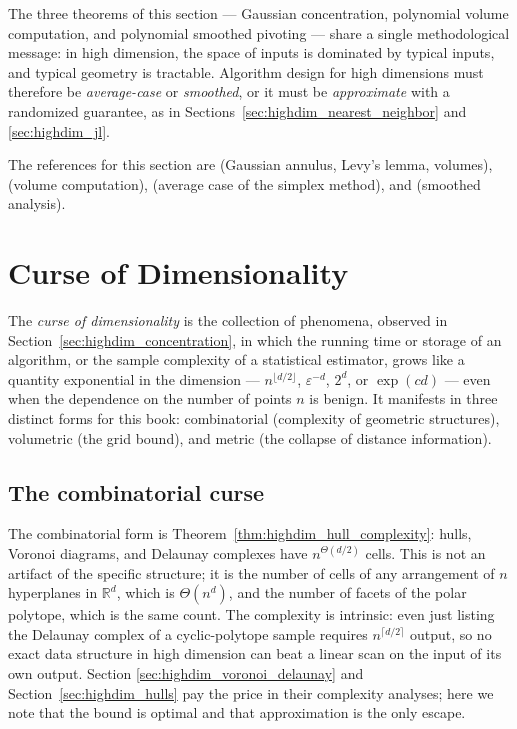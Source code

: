 \begin{remark}
The three theorems of this section --- Gaussian concentration, polynomial
volume computation, and polynomial smoothed pivoting --- share a single
methodological message: in high dimension, the space of inputs is dominated by
typical inputs, and typical geometry is tractable. Algorithm design for high
dimensions must therefore be \emph{average-case} or \emph{smoothed}, or it
must be \emph{approximate} with a randomized guarantee, as in
Sections~\ref{sec:highdim_nearest_neighbor} and \ref{sec:highdim_jl}.
\end{remark}

The references for this section are \cite{matousek2002} (Gaussian annulus,
Levy's lemma, volumes), \cite{dyerfriezekannan1991} (volume computation),
\cite{borgwardt1987} (average case of the simplex method), and
\cite{spielteng2004} (smoothed analysis).

\section{Curse of Dimensionality}
\label{sec:highdim_curse}

\begin{definition}
\label{def:highdim_curse}
The \emph{curse of dimensionality} is the
collection of phenomena, observed in Section~\ref{sec:highdim_concentration},
in which the running time or storage of an algorithm, or the sample complexity
of a statistical estimator, grows like a quantity exponential in the
dimension --- $n^{\lfloor d/2 \rfloor}$, $\varepsilon^{-d}$, $2^d$, or
$\exp(c d)$ --- even when the dependence on the number of points $n$ is
benign. It manifests in three distinct forms for this book: combinatorial
(complexity of geometric structures), volumetric (the grid bound), and
metric (the collapse of distance information).
\end{definition}

\subsection{The combinatorial curse}

The combinatorial form is Theorem~\ref{thm:highdim_hull_complexity}: hulls,
Voronoi diagrams, and Delaunay complexes have
$n^{\Theta(d/2)}$ cells. This is not an artifact of the specific structure;
it is the number of cells of any arrangement of $n$ hyperplanes in
$\mathbb{R}^d$, which is $\Theta(n^d)$, and the number of facets of the
polar polytope, which is the same count. The complexity is intrinsic: even
just listing the Delaunay complex of a cyclic-polytope sample requires
$n^{\lceil d/2 \rceil}$ output, so no exact data structure in high dimension
can beat a linear scan on the input of its own output. Section
\ref{sec:highdim_voronoi_delaunay} and Section~\ref{sec:highdim_hulls} pay the
price in their complexity analyses; here we note that the bound is optimal
and that approximation is the only escape.

